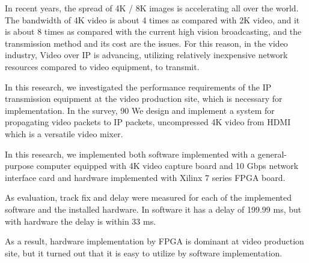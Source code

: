 \begin{eabstract}

In recent years, the spread of 4K / 8K images is accelerating all over the world.
The bandwidth of 4K video is about 4 times as compared with 2K video, and it is about 8 times as compared with the current high vision broadcasting, and the transmission method and its cost are the issues.
For this reason, in the video industry, Video over IP is advancing, utilizing relatively inexpensive network resources compared to video equipment, to transmit.

In this research, we investigated the performance requirements of the IP transmission equipment at the video production site, which is necessary for implementation. In the survey, 90%
We design and implement a system for propagating video packets to IP packets, uncompressed 4K video from HDMI which is a versatile video mixer.

In this research, we implemented both software implemented with a general-purpose computer equipped with 4K video capture board and 10 Gbps network interface card and hardware implemented with Xilinx 7 series FPGA board.

As evaluation, track fix and delay were measured for each of the implemented software and the installed hardware.
In software it has a delay of 199.99 ms, but with hardware the delay is within 33 ms.

As a result, hardware implementation by FPGA is dominant at video production site, but it turned out that it is easy to utilize by software implementation.

\end{eabstract}
